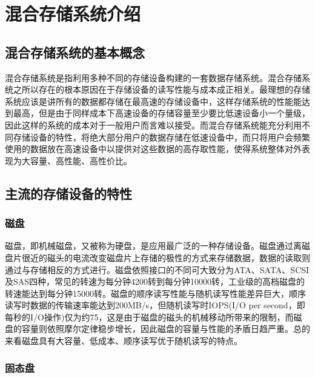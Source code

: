 
\chapter{混合存储系统介绍}
\label{chap:hss}

\section{混合存储系统的基本概念}

混合存储系统是指利用多种不同的存储设备构建的一套数据存储系统。混合存储系统之所以存在的根本原因在于存储设备的读写性能与成本成正相关。最理想的存储系统应该是讲所有的数据都存储在最高速的存储设备中，这样存储系统的性能能达到最高，但是由于同样成本下高速设备的存储容量至少要比低速设备小一个量级，因此这样的系统的成本对于一般用户而言难以接受。而混合存储系统能充分利用不同存储设备的特性，将绝大部分用户的数据存储在低速设备中，而只将用户会频繁使用的数据放在高速设备中以提供对这些数据的高存取性能，使得系统整体对外表现为大容量、高性能、高性价比。

\section{主流的存储设备的特性}

\subsection{磁盘}

磁盘，即机械磁盘，又被称为硬盘，是应用最广泛的一种存储设备。磁盘通过离磁盘片很近的磁头的电流改变磁盘片上存储的极性的方式来存储数据，数据的读取则通过与存储相反的方式进行。磁盘依照接口的不同可大致分为ATA、SATA、SCSI及SAS四种，常见的转速为每分钟4200转到每分钟10000转，工业级的高档磁盘的转速能达到每分钟15000转。磁盘的顺序读写性能与随机读写性能差异巨大，顺序读写时数据的传输速率能达到200MB/s，但随机读写时IOPS(I/O per second，即每秒的I/O操作)仅为约75，这是由于磁盘的磁头的机械移动所带来的限制，而磁盘的容量则依照摩尔定律稳步增长，因此磁盘的容量与性能的矛盾日趋严重。总的来看磁盘具有大容量、低成本、顺序读写优于随机读写的特点。

\subsection{固态盘}


